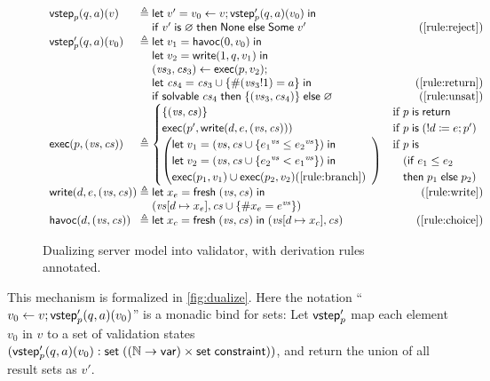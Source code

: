 \begin{figure}
\[\begin{array}{l@{\;}r@{\;}l}
\vstep_p(q,a)(v)&\triangleq&\letin{v'}{v_0\gets v;\vstep'_p(q,a)(v_0)}\\
&&\If v'\Is\varnothing\Then\None\Else\Some v'\hfill(\ref{rule:reject})\\
\vstep'_p(q,a)(v_0)&\triangleq&\letin{v_1}{\Havoc(0,v_0)}\\
&&\letin{v_2}{\Write(1,q,v_1)}\\
&&(\vs_3,\cs_3)\gets\Exec(p,v_2);\\
&&\letin{\cs_4}{\cs_3\cup\{\#(\vs_3!1)= a\}}\hfill(\ref{rule:return})\\
&&\If\solvable \cs_4\Then\{(\vs_3,\cs_4)\}\Else\varnothing\hfill(\ref{rule:unsat})\\
\Exec(p,(\vs,\cs))&\triangleq&\begin{cases}
  \{(\vs,\cs)\}&\text{if }p\Is\Return\\
  \Exec(p',\Write(d,e,(\vs,\cs)))&\text{if }p\Is(!d\coloneqq e;p')\\
  \left(\begin{array}{@{}l}
    \letin{v_1}{(\vs,\cs\cup\{{e_1}^{\vs}\le{e_2}^{\vs}\})}\\
    \letin{v_2}{(\vs,\cs\cup\{{e_2}^{\vs}<{e_1}^{\vs}\})}\\
    \Exec(p_1,v_1)\cup\Exec(p_2,v_2)\hfill(\ref{rule:branch})
  \end{array}\right)&\begin{array}{@{}l@{}l}\text{if }&p\Is\\
    &(\If e_1\le e_2\\
    &\tthen p_1\Else p_2)\end{array}
\end{cases}\\
\Write(d,e,(\vs,\cs))&\triangleq&\letin{x_e}{\Fresh (\vs,\cs)}\hfill(\ref{rule:write})\\
&&(\update{\vs}{d}{x_e},\cs\cup\{\#x_e=e^{\vs}\})\\
\Havoc(d,(\vs,\cs))&\triangleq&\letin{x_c}{\Fresh (\vs,\cs)}(\update{\vs}{d}{x_c},\cs)\hfill(\ref{rule:choice})
\end{array}\]
\caption[Dualizing server model into validator]{Dualizing server model into
  validator, with derivation rules annotated.}
\label{fig:dualize}
\end{figure}

This mechanism is formalized in \autoref{fig:dualize}.  Here the notation
``$v_0\gets v;\mathsf{vstep}'_p(q,a)(v_0)$'' is a monadic bind for sets: Let $\mathsf{vstep}'_p$
map each element $v_0$ in $v$ to a set of validation states
$(\mathsf{vstep}'_p(q,a)(v_0):\mathsf{set}\;((\mathbb N\to\mathsf{var})\times\mathsf{set}\;\mathsf{constraint}))$, and return the
union of all result sets as $v'$.


